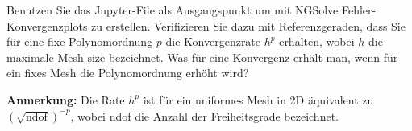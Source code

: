 
\begin{exercise}
Benutzen Sie das Jupyter-File
als Ausgangspunkt um mit NGSolve
Fehler-Konvergenzplots zu erstellen. Verifizieren Sie dazu mit Referenzgeraden, dass Sie für eine fixe
Polynomordnung $p$ die Konvergenzrate $h^p$ erhalten, wobei $h$ die maximale Mesh-size bezeichnet.
Was für eine Konvergenz erhält man, wenn für ein fixes Mesh die Polynomordnung erhöht wird?

\textbf{Anmerkung:} Die Rate $h^p$ ist für ein uniformes Mesh in 2D äquivalent zu $(\sqrt{\text{ndof}})^{-p}$, wobei ndof die Anzahl der Freiheitsgrade bezeichnet.
\end{exercise}


\begin{solution}

\end{solution}

